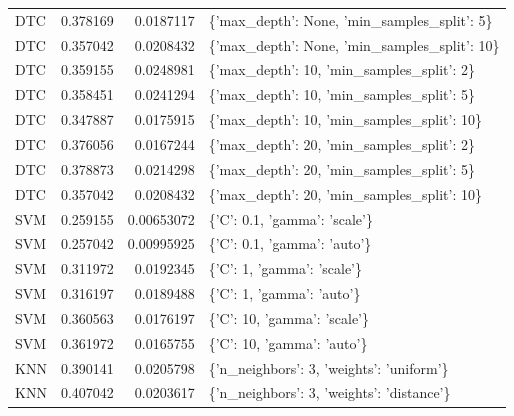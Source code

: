 \documentclass[conference,onecolumn]{IEEEtran}
\begin{document}
\begin{table}[H]
\begin{center}
\begin{longtable}{lrrl}
             DTC          &   0.378169 &       0.0187117  & \{'max\_depth': None, 'min\_samples\_split': 5\}                       \\
             DTC          &   0.357042 &       0.0208432  & \{'max\_depth': None, 'min\_samples\_split': 10\}                      \\
             DTC          &   0.359155 &       0.0248981  & \{'max\_depth': 10, 'min\_samples\_split': 2\}                         \\
             DTC          &   0.358451 &       0.0241294  & \{'max\_depth': 10, 'min\_samples\_split': 5\}                         \\
             DTC          &   0.347887 &       0.0175915  & \{'max\_depth': 10, 'min\_samples\_split': 10\}                        \\
             DTC          &   0.376056 &       0.0167244  & \{'max\_depth': 20, 'min\_samples\_split': 2\}                         \\
             DTC          &   0.378873 &       0.0214298  & \{'max\_depth': 20, 'min\_samples\_split': 5\}                         \\
             DTC          &   0.357042 &       0.0208432  & \{'max\_depth': 20, 'min\_samples\_split': 10\}                        \\
             SVM          &   0.259155 &       0.00653072 & \{'C': 0.1, 'gamma': 'scale'\}                                      \\
             SVM          &   0.257042 &       0.00995925 & \{'C': 0.1, 'gamma': 'auto'\}                                       \\
             SVM          &   0.311972 &       0.0192345  & \{'C': 1, 'gamma': 'scale'\}                                        \\
             SVM          &   0.316197 &       0.0189488  & \{'C': 1, 'gamma': 'auto'\}                                         \\
             SVM          &   0.360563 &       0.0176197  & \{'C': 10, 'gamma': 'scale'\}                                       \\
             SVM          &   0.361972 &       0.0165755  & \{'C': 10, 'gamma': 'auto'\}                                        \\
             KNN          &   0.390141 &       0.0205798  & \{'n\_neighbors': 3, 'weights': 'uniform'\}                          \\
             KNN          &   0.407042 &       0.0203617  & \{'n\_neighbors': 3, 'weights': 'distance'\}                         \\

\end{longtable}
\end{center}
\end{table}
\end{document}
